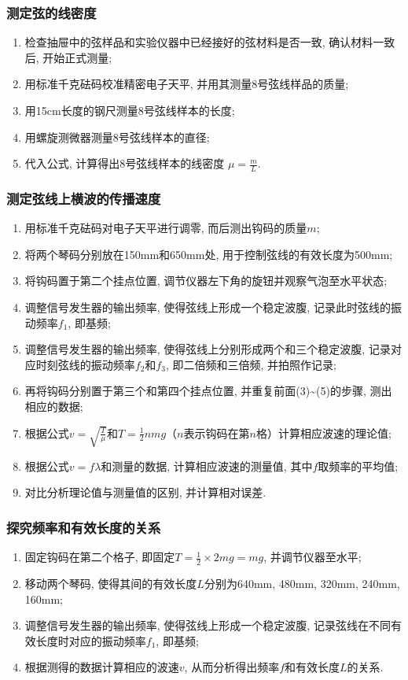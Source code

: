 \documentclass[zihao=5, UTF8]{article}
\theoremstyle{MyLineTheoremStyle} %
\theoremstyle{MyBlockTheoremStyle} %
\theoremstyle{MySubsubsectionStyle} %
\begin{document}
\subsubsection{测定弦的线密度}
\begin{enumerate}
    \item 检查抽屉中的弦样品和实验仪器中已经接好的弦材料是否一致, 确认材料一致后, 开始正式测量;
    \item 用标准千克砝码校准精密电子天平, 并用其测量8号弦线样品的质量;
    \item 用15cm长度的钢尺测量8号弦线样本的长度;
    \item 用螺旋测微器测量8号弦线样本的直径;
    \item 代入公式, 计算得出8号弦线样本的线密度 $\mu = \frac{m}{L}$. 
\end{enumerate}

\subsubsection{测定弦线上横波的传播速度}
\begin{enumerate}
    \item 用标准千克砝码对电子天平进行调零, 而后测出钩码的质量$m$;
    \item 将两个琴码分别放在150mm和650mm处, 用于控制弦线的有效长度为500mm;
    \item 将钩码置于第二个挂点位置, 调节仪器左下角的旋钮并观察气泡至水平状态;
    \item 调整信号发生器的输出频率, 使得弦线上形成一个稳定波腹, 记录此时弦线的振动频率$f_{1}$, 即基频;
    \item 调整信号发生器的输出频率, 使得弦线上分别形成两个和三个稳定波腹, 记录对应时刻弦线的振动频率$f_{2}$和$f_{3}$, 即二倍频和三倍频, 并拍照作记录;
    \item 再将钩码分别置于第三个和第四个挂点位置, 并重复前面(3)\textasciitilde(5)的步骤, 测出相应的数据;
    \item 根据公式$v = \sqrt{\frac{T}{\mu}}$和$T = \frac{1}{2}nmg$（$n$表示钩码在第$n$格）计算相应波速的理论值;
    \item 根据公式$v = f\lambda$和测量的数据, 计算相应波速的测量值, 其中$f$取频率的平均值;
    \item 对比分析理论值与测量值的区别, 并计算相对误差. 
\end{enumerate}

\subsubsection{探究频率和有效长度的关系}
\begin{enumerate}
    \item 固定钩码在第二个格子, 即固定$T = \frac{1}{2}\times2mg = mg$, 并调节仪器至水平;
    \item 移动两个琴码, 使得其间的有效长度$L$分别为640mm, 480mm, 320mm, 240mm, 160mm;
    \item 调整信号发生器的输出频率, 使得弦线上形成一个稳定波腹, 记录弦线在不同有效长度时对应的振动频率$f_{1}$, 即基频;
    \item 根据测得的数据计算相应的波速$v$, 从而分析得出频率$f$和有效长度$L$的关系. 
\end{enumerate}
\end{document}
